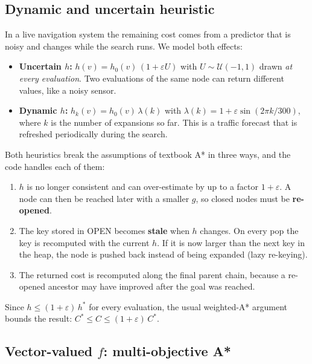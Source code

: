 

\subsection{Dynamic and uncertain heuristic}
\label{sec:seq-dyn}

In a live navigation system the remaining cost comes from a predictor that is
noisy and changes while the search runs. We model both effects:

\begin{itemize}[nosep]
  \item \textbf{Uncertain $h$:} $h(v) = h_0(v)\,(1 + \varepsilon U)$ with
        $U \sim \mathcal{U}(-1, 1)$ drawn \emph{at every evaluation}. Two
        evaluations of the same node can return different values, like a
        noisy sensor.
  \item \textbf{Dynamic $h$:} $h_k(v) = h_0(v)\,\lambda(k)$ with
        $\lambda(k) = 1 + \varepsilon \sin(2\pi k/300)$, where $k$ is the
        number of expansions so far. This is a traffic forecast that is
        refreshed periodically during the search.
\end{itemize}

Both heuristics break the assumptions of textbook A* in three ways, and the
code handles each of them:

\begin{enumerate}[nosep]
  \item $h$ is no longer consistent and can over-estimate by up to a factor
        $1+\varepsilon$. A node can then be reached later with a smaller $g$,
        so closed nodes must be \textbf{re-opened}.
  \item The key stored in OPEN becomes \textbf{stale} when $h$ changes. On
        every pop the key is recomputed with the current $h$. If it is now
        larger than the next key in the heap, the node is pushed back instead
        of being expanded (lazy re-keying).
  \item The returned cost is recomputed along the final parent chain, because
        a re-opened ancestor may have improved after the goal was reached.
\end{enumerate}

Since $h \le (1+\varepsilon)\,h^*$ for every evaluation, the usual
weighted-A* argument bounds the result: $C^* \le C \le (1+\varepsilon)\,C^*$.



\subsection{\texorpdfstring{Vector-valued $f$}{Vector-valued f}: multi-objective A*}

